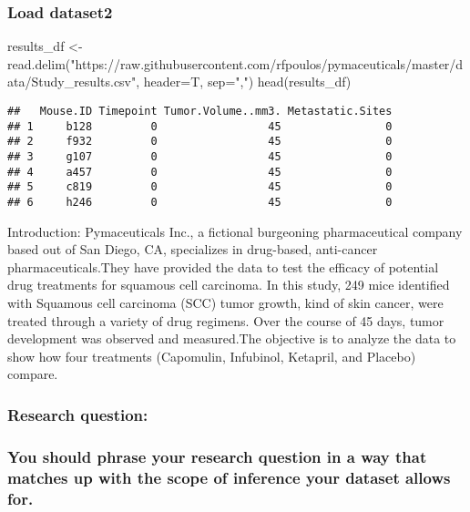 \documentclass[
]{article}
\newenvironment{Shaded}{\begin{snugshade}}{\end{snugshade}}
\newcommand{\AttributeTok}[1]{\textcolor[rgb]{0.77,0.63,0.00}{#1}}
\newcommand{\FunctionTok}[1]{\textcolor[rgb]{0.00,0.00,0.00}{#1}}
\newcommand{\NormalTok}[1]{#1}
\newcommand{\OtherTok}[1]{\textcolor[rgb]{0.56,0.35,0.01}{#1}}
\newcommand{\StringTok}[1]{\textcolor[rgb]{0.31,0.60,0.02}{#1}}
\begin{document}
\hypertarget{load-dataset2}{%
\subsubsection{Load dataset2}\label{load-dataset2}}

\begin{Shaded}
\begin{Highlighting}[]
\NormalTok{results\_df }\OtherTok{\textless{}{-}} \FunctionTok{read.delim}\NormalTok{(}\StringTok{"https://raw.githubusercontent.com/rfpoulos/pymaceuticals/master/data/Study\_results.csv"}\NormalTok{, }\AttributeTok{header=}\NormalTok{T, }\AttributeTok{sep=}\StringTok{","}\NormalTok{)}
\FunctionTok{head}\NormalTok{(results\_df)}
\end{Highlighting}
\end{Shaded}

\begin{verbatim}
##   Mouse.ID Timepoint Tumor.Volume..mm3. Metastatic.Sites
## 1     b128         0                 45                0
## 2     f932         0                 45                0
## 3     g107         0                 45                0
## 4     a457         0                 45                0
## 5     c819         0                 45                0
## 6     h246         0                 45                0
\end{verbatim}

Introduction: Pymaceuticals Inc., a fictional burgeoning pharmaceutical
company based out of San Diego, CA, specializes in drug-based,
anti-cancer pharmaceuticals.They have provided the data to test the
efficacy of potential drug treatments for squamous cell carcinoma. In
this study, 249 mice identified with Squamous cell carcinoma (SCC) tumor
growth, kind of skin cancer, were treated through a variety of drug
regimens. Over the course of 45 days, tumor development was observed and
measured.The objective is to analyze the data to show how four
treatments (Capomulin, Infubinol, Ketapril, and Placebo) compare.

\hypertarget{research-question}{%
\subsubsection{Research question:}\label{research-question}}

\hypertarget{you-should-phrase-your-research-question-in-a-way-that-matches-up-with-the-scope-of-inference-your-dataset-allows-for.}{%
\subsubsection{You should phrase your research question in a way that
matches up with the scope of inference your dataset allows
for.}\label{you-should-phrase-your-research-question-in-a-way-that-matches-up-with-the-scope-of-inference-your-dataset-allows-for.}}
\end{document}
